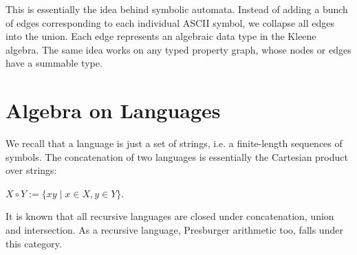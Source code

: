 \documentclass[11pt]{article}
\begin{document}
  This is essentially the idea behind symbolic automata. Instead of adding a bunch of edges corresponding to each individual ASCII symbol, we collapse all edges into the union. Each edge represents an algebraic data type in the Kleene algebra. The same idea works on any typed property graph, whose nodes or edges have a summable type.

  \newpage

  \section{Algebra on Languages}

We recall that a language is just a set of strings, i.e. a finite-length sequences of symbols. The concatenation of two languages is essentially the Cartesian product over strings:

$X \circ Y := \{xy \mid x \in X, y \in Y\}$.

It is known that all recursive languages are closed under concatenation, union and intersection. As a recursive language, Presburger arithmetic too, falls under this category.
\end{document}
